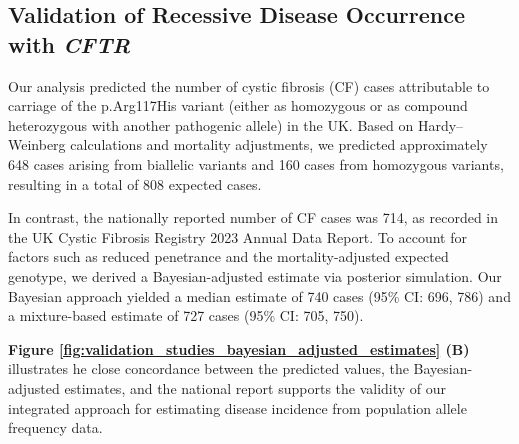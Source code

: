 \subsection{Validation of Recessive Disease Occurrence with \textit{CFTR}}

Our analysis predicted the number of cystic fibrosis (CF) cases attributable to carriage of the p.Arg117His variant (either as homozygous or as compound heterozygous with another pathogenic allele) in the UK. Based on Hardy–Weinberg calculations and mortality adjustments, we predicted approximately 648 cases arising from biallelic variants and 160 cases from homozygous variants, resulting in a total of 808 expected cases.

In contrast, the nationally reported number of CF cases was 714, as recorded in the UK Cystic Fibrosis Registry 2023 Annual Data Report. To account for factors such as reduced penetrance and the mortality-adjusted expected genotype, we derived a Bayesian-adjusted estimate via posterior simulation. Our Bayesian approach yielded a median estimate of 740 cases (95\% CI: 696, 786) and a mixture-based estimate of 727 cases (95\% CI: 705, 750).

\textbf{Figure \ref{fig:validation_studies_bayesian_adjusted_estimates} (B)} illustrates he close concordance between the predicted values, the Bayesian-adjusted estimates, and the national report supports the validity of our integrated approach for estimating disease incidence from population allele frequency data.

